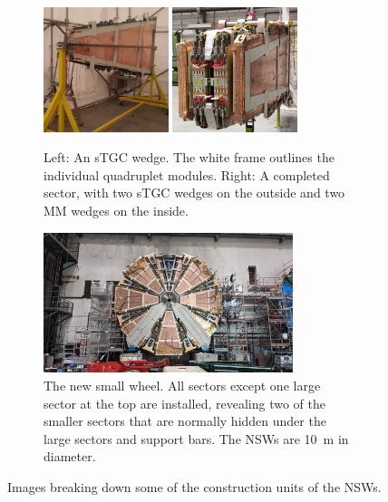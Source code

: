 \begin{figure}
\begin{subfigure}{\textwidth}
  \centering
  \includegraphics[width=0.4\textwidth]{figures/stgc_wedge.jpg}
  \includegraphics[width=0.4\textwidth]{figures/sector.jpg}
  \caption{Left: An sTGC wedge. The white frame outlines the individual quadruplet modules. Right: A completed sector, with two sTGC wedges on the outside and two MM wedges on the inside.}
  \label{fig:wedge_and_sector}
\end{subfigure}

\smallskip

\begin{subfigure}{\textwidth}
  \centering
  \includegraphics[width=0.8\textwidth]{figures/nsw_2021-05-27_landscape.jpeg}
  \caption{The new small wheel. All sectors except one large sector at the top are installed, revealing two of the smaller sectors that are normally hidden under the large sectors and support bars. The NSWs are \SI{10}{m} in diameter. }
  \label{fig:nsw}
  \end{subfigure}
\caption{Images breaking down some of the construction units of the NSWs.}
\label{fig:nsw_breakdown}
\end{figure}

